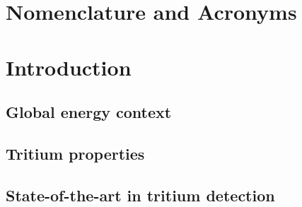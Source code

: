 \documentclass[12pt,a4paper]{book}
\begin{document}
\chapter*{Nomenclature and Acronyms} \label{chap:NomenclatureAcronyms}  %
{} %


\let\OLDthebibliography=\thebibliography
\def\thebibliography#1{\OLDthebibliography{#1}%
\addcontentsline{toc}{chapter}{\bibname}}

\tableofcontents

\listoffigures

{} %

\listoftables

{} %




\chapter{Introduction}  \label{chap:GeneralIntroduction} %
	\section{Global energy context}\label{sec:Introduction}
	 
	\newpage

	\section{Tritium properties}\label{sec:TritiumProperties}
	
	\newpage
	
	\section{State-of-the-art in tritium detection}\label{sec:StateOfTheArt}
	
	\newpage
	
\end{document}
